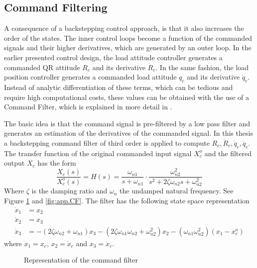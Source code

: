 \subsection{Command Filtering}
A consequence of a backstepping control approach, is that it also increases the order of the states. The inner control loops become a function of the commanded signals and their higher derivatives, which are generated by an outer loop.
In the earlier presented control design, the load attitude controller generates a commanded QR attitude $ R_c $ and its derivative $ \dot{R}_c $. In the same fashion, the load position controller generates a commanded load attitude $ q_c $ and its derivative $ \dot{q}_c $. 
Instead of analytic differentiation of these terms, which can be tedious and require high computational costs, these values can be obtained with the use of a Command Filter, which is explained in more detail in \cite{Farrell2008}. 

The basic idea is that the command signal is pre-filtered by a low pass filter and generates an estimation of the derivatives of the commanded signal. 
In this thesis a backstepping command filter of third order is applied to compute $ \dot{R}_c, \ddot{R}_c,\dot{q}_c, \ddot{q}_c $. 
The transfer function of the original commanded input signal $ X_c^o $ and the filtered output $ X_c $ has the form
\begin{equation}\label{key}
\frac{X_c(s)}{X_c^o(s)}=H(s)=\frac{\omega_{n1}}{s+\omega_{n1}}\cdot\frac{\omega_{n2}^2}{s^2+2\zeta\omega_{n2}s+\omega_{n2}^2}
\end{equation}
Where $ \zeta $ is the damping ratio and $ \omega_n $ the undamped natural frequency. See Figure \ref{fig:set.CF} and \ref{fig:app.CF}.
The filter has the following state space representation
\begin{align}\label{key}
\dot{x}_1 &= x_2\\ %
\dot{x}_2 &= x_3\\ %
\dot{x}_3 &= -(2\zeta \omega_{n2}+\omega_{n1})x_3-(2\zeta\omega_{n1}\omega_{n2}+\omega_{n2}^2)x_2-(\omega_{n1}\omega_{n2}^2)(x_1-x_c^o)
\end{align}
where $ x_1 = x_c$, $ x_2 = \dot{x}_c$ and $ x_3 = \ddot{x}_c$. 
\begin{figure}[h!]
	\centering
	\caption{Representation of the command filter\label{fig:set.CF}}
\end{figure}		

